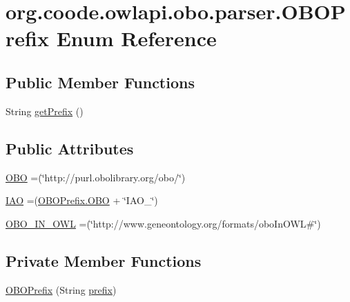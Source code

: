 \hypertarget{enumorg_1_1coode_1_1owlapi_1_1obo_1_1parser_1_1_o_b_o_prefix}{\section{org.\-coode.\-owlapi.\-obo.\-parser.\-O\-B\-O\-Prefix Enum Reference}
\label{enumorg_1_1coode_1_1owlapi_1_1obo_1_1parser_1_1_o_b_o_prefix}
}
\subsection*{Public Member Functions}
\begin{DoxyCompactItemize}
\item 
String \hyperlink{enumorg_1_1coode_1_1owlapi_1_1obo_1_1parser_1_1_o_b_o_prefix_acdcb908b27fe98e31c8d2cb05d898fce}{get\-Prefix} ()
\end{DoxyCompactItemize}
\subsection*{Public Attributes}
\begin{DoxyCompactItemize}
\item 
\hyperlink{enumorg_1_1coode_1_1owlapi_1_1obo_1_1parser_1_1_o_b_o_prefix_a2caaeadeee7bf92de51200e3ab3f2bec}{O\-B\-O} =(\char`\"{}http\-://purl.\-obolibrary.\-org/obo/\char`\"{})
\item 
\hyperlink{enumorg_1_1coode_1_1owlapi_1_1obo_1_1parser_1_1_o_b_o_prefix_ab17056d15a7f13e16c596bd372619739}{I\-A\-O} =(\hyperlink{enumorg_1_1coode_1_1owlapi_1_1obo_1_1parser_1_1_o_b_o_prefix_a2caaeadeee7bf92de51200e3ab3f2bec}{O\-B\-O\-Prefix.\-O\-B\-O} + \char`\"{}I\-A\-O\-\_\-\char`\"{})
\item 
\hyperlink{enumorg_1_1coode_1_1owlapi_1_1obo_1_1parser_1_1_o_b_o_prefix_a175fee974ad624961226496c349da916}{O\-B\-O\-\_\-\-I\-N\-\_\-\-O\-W\-L} =(\char`\"{}http\-://www.\-geneontology.\-org/formats/obo\-In\-O\-W\-L\#\char`\"{})
\end{DoxyCompactItemize}
\subsection*{Private Member Functions}
\begin{DoxyCompactItemize}
\item 
\hyperlink{enumorg_1_1coode_1_1owlapi_1_1obo_1_1parser_1_1_o_b_o_prefix_a335ab87007e9627d8405704756bde6d2}{O\-B\-O\-Prefix} (String \hyperlink{enumorg_1_1coode_1_1owlapi_1_1obo_1_1parser_1_1_o_b_o_prefix_a75d54da35bd40b55bc3028c5bed5190e}{prefix})
\end{DoxyCompactItemize}

